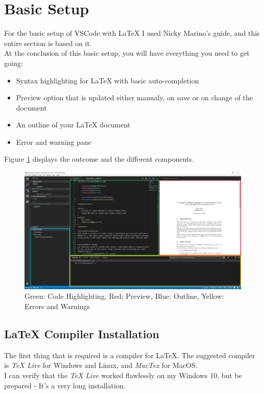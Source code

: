 \documentclass{article}
\newcommand{\latex}{\LaTeX\xspace}
\begin{document}
\section{Basic Setup} \label{sec:basic_setup}
For the basic setup of VSCode with \latex I used Nicky Marino's guide\footnotemark[3], and this entire section is based on it.\\
At the conclusion of this basic setup, you will have everything you need to get going:
\begin{itemize}
	\item{Syntax highlighting for \latex with basic auto-completion}
	\item{Preview option that is updated either manualy, on save or on change of the document}
	\item{An outline of your \latex document}
	\item{Error and warning pane}
\end{itemize}
Figure \ref{fig:vscode_with_latex_highlights} displays the outcome and the different components.
\begin{figure}
	\includegraphics[width=\linewidth]{../resources/vscode_with_latex_highlights.png}
	\caption{Green: Code Highlighting, Red: Preview, Blue: Outline, Yellow: Errors and Warnings}
	\label{fig:vscode_with_latex_highlights}
\end{figure}

\subsection{\latex Compiler Installation}
The first thing that is required is a compiler for \latex. The suggested compiler is \emph{TeX Live} for Windows and Linux, and \emph{MacTex} for MacOS.\\
I can verify that the \emph{TeX Live} worked flawlessly on my Windows 10, but be prepared - It's a very long installation.
\end{document}
